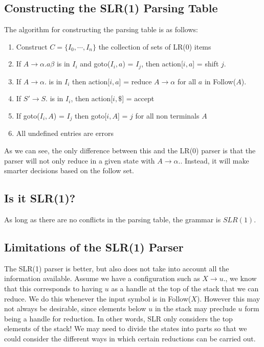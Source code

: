 \documentclass[12pt,letterpaper]{book}
\theoremstyle{definition}
\begin{document}
\subsection{Constructing the SLR(1) Parsing Table}

The algorithm for constructing the parsing table is as follows:

\begin{enumerate}
  \item Construct $C = \{I_0,\cdots,I_n\}$ the collection of sets of LR(0) items
  \item If $A \rightarrow \alpha . a\beta$ is in $I_i$ and goto($I_i,a$) = $I_j$, then action[$i,a$] = shift $j$.
  \item If $A \rightarrow \alpha .$ is in $I_i$ then action[$i,a$] = reduce $A \rightarrow \alpha$ for all $a$ in Follow($A$).
  \item If $S' \rightarrow S.$ is in $I_i$, then action[$i,\$$] = accept
  \item If goto($I_i,A$) = $I_j$ then goto[$i,A$] = $j$ for all non terminals $A$
  \item All undefined entries are errors
\end{enumerate}

As we can see, the only difference between this and the LR(0) parser is that the parser will not only reduce in a given state with $A \rightarrow \alpha .$. Instead, it will make smarter decisions based on the follow set.

\subsection{Is it SLR(1)?}

As long as there are no conflicts in the parsing table, the grammar is $SLR(1)$.

\subsection{Limitations of the SLR(1) Parser}

The SLR(1) parser is better, but also does not take into account all the information available. Assume we have a configuration such as $X \rightarrow u .$, we know that this corresponds to having $u$ as a handle at the top of the stack that we can reduce. We do this whenever the input symbol is in Follow($X$). However this may not always be desirable, since elements below $u$ in the stack may preclude $u$ form being a handle for reduction. In other words, SLR only considers the top elements of the stack! We may need to divide the states into parts so that we could consider the different ways in which certain reductions can be carried out.
\end{document}
